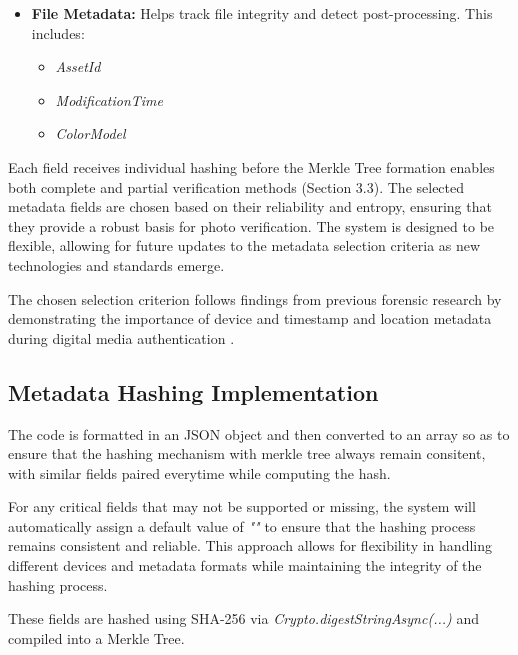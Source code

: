 \begin{itemize}
    \item {\textbf{File Metadata:}} Helps track file integrity and detect post-processing. This includes:
    \begin{itemize}
        \item \textit{AssetId}
        \item \textit{ModificationTime}
        \item \textit{ColorModel}
    \end{itemize}
\end{itemize}

Each field receives individual hashing before the Merkle Tree formation enables both complete and partial verification methods (Section 3.3).
The selected metadata fields are chosen based on their reliability and entropy, ensuring that they provide a robust basis for photo verification. The system is designed to be flexible, allowing for future updates to the metadata selection criteria as new technologies and standards emerge.

The chosen selection criterion follows findings from previous forensic research by demonstrating the importance of device and timestamp and location metadata during digital media authentication \cite{authenticationOfDigitalImageExifMetadata} \cite{authenticationOfDigitalImageJpegHeaders}.

\subsection{Metadata Hashing Implementation}
The code is formatted in an JSON object and then converted to an array so as to ensure that the hashing mechanism with merkle tree always remain consitent, with similar fields paired everytime while computing the hash. 

For any critical fields that may not be supported or missing, the system will automatically assign a default value of \textit{""} to ensure that the hashing process remains consistent and reliable. This approach allows for flexibility in handling different devices and metadata formats while maintaining the integrity of the hashing process.



These fields are hashed using SHA-256 via \textit{Crypto.digestStringAsync(...)} and compiled into a Merkle Tree.

